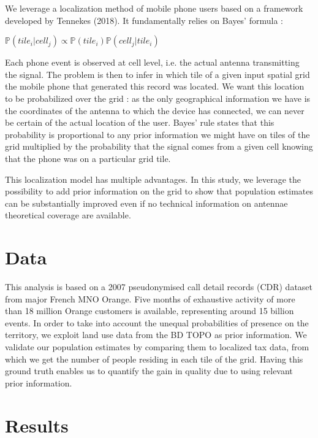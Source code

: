 \documentclass[12pt]{article}
\begin{document}
We leverage a localization method of mobile phone users based on a framework developed by Tennekes (2018). It fundamentally relies on Bayes' formula :

\begin{center}
\begingroup
\large
$\mathbb{P}(tile_i | cell_j) \propto \mathbb{P}(tile_i) \mathbb{P}(cell_j | tile_i)$
\endgroup
\end{center}

Each phone event is observed at cell level, i.e. the actual antenna transmitting the signal. 
The problem is then to infer in which tile of a given input spatial grid the mobile phone that generated this record was located. We want this location to be probabilized over the grid : as the only geographical information we have is the coordinates of the antenna to which the device has connected, we can never be certain of the actual location of the user. Bayes' rule states that this probability is proportional to any prior information we might have on tiles of the grid multiplied by the probability that the signal comes from a given cell knowing that the phone was on a particular grid tile. 

This localization model has multiple advantages. In this study, we leverage the possibility to add prior information on the grid to show that population estimates can be substantially improved even if no technical information on antennae theoretical coverage are available.

\section{Data}

This analysis is based on a 2007 pseudonymised call detail records (CDR) dataset from major French MNO Orange. Five months of exhaustive activity of more than 18 million Orange customers is available, representing around 15 billion events. In order to take into account the unequal probabilities of presence on the territory, we exploit land use data from the BD TOPO as prior information. We validate our population estimates by comparing them to localized tax data, from which we get the number of people residing in each tile of the grid. Having this ground truth enables us to quantify the gain in quality due to using relevant prior information.

\section{Results}
\end{document}

